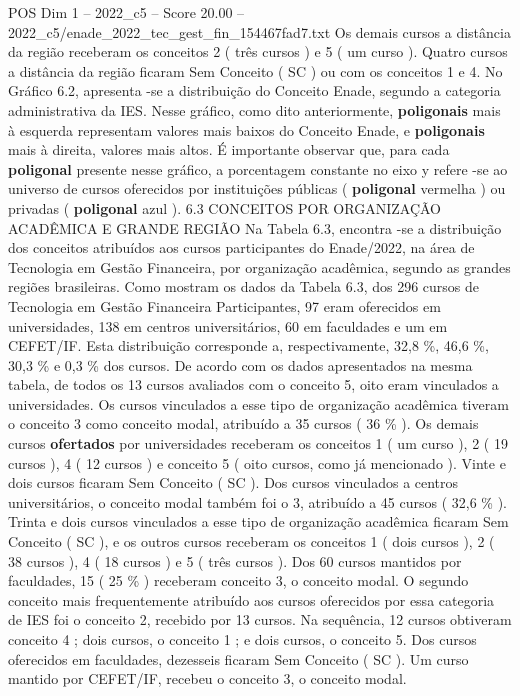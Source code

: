 \begin{textsample}{POS Dim 1 – 2022\_c5 – Score 20.00 – 2022\_c5/enade\_2022\_tec\_gest\_fin\_154467fad7.txt}
Os demais cursos a distância da região receberam os conceitos 2 ( três cursos ) e 5 ( um curso ).
Quatro cursos a distância da região ficaram Sem Conceito ( SC ) ou com os conceitos 1 e 4.
No Gráfico 6.2, apresenta -se a distribuição do Conceito Enade, segundo a categoria administrativa da IES.
Nesse gráfico, como dito anteriormente, \textbf{poligonais} mais à esquerda representam valores mais baixos do Conceito Enade, e \textbf{poligonais} mais à direita, valores mais altos.
É importante observar que, para cada \textbf{poligonal} presente nesse gráfico, a porcentagem constante no eixo y refere -se ao universo de cursos oferecidos por instituições públicas ( \textbf{poligonal} vermelha ) ou privadas ( \textbf{poligonal} azul ). 6.3 CONCEITOS POR ORGANIZAÇÃO ACADÊMICA E GRANDE REGIÃO Na Tabela 6.3, encontra -se a distribuição dos conceitos atribuídos aos cursos participantes do Enade/2022, na área de Tecnologia em Gestão Financeira, por organização acadêmica, segundo as grandes regiões brasileiras.
Como mostram os dados da Tabela 6.3, dos 296 cursos de Tecnologia em Gestão Financeira Participantes, 97 eram oferecidos em universidades, 138 em centros universitários, 60 em faculdades e um em CEFET/IF.
Esta distribuição corresponde a, respectivamente, 32,8 \%, 46,6 \%, 30,3 \% e 0,3 \% dos cursos.
De acordo com os dados apresentados na mesma tabela, de todos os 13 cursos avaliados com o conceito 5, oito eram vinculados a universidades.
Os cursos vinculados a esse tipo de organização acadêmica tiveram o conceito 3 como conceito modal, atribuído a 35 cursos ( 36 \% ).
Os demais cursos \textbf{ofertados} por universidades receberam os conceitos 1 ( um curso ), 2 ( 19 cursos ), 4 ( 12 cursos ) e conceito 5 ( oito cursos, como já mencionado ).
Vinte e dois cursos ficaram Sem Conceito ( SC ).
Dos cursos vinculados a centros universitários, o conceito modal também foi o 3, atribuído a 45 cursos ( 32,6 \% ).
Trinta e dois cursos vinculados a esse tipo de organização acadêmica ficaram Sem Conceito ( SC ), e os outros cursos receberam os conceitos 1 ( dois cursos ), 2 ( 38 cursos ), 4 ( 18 cursos ) e 5 ( três cursos ).
Dos 60 cursos mantidos por faculdades, 15 ( 25 \% ) receberam conceito 3, o conceito modal.
O segundo conceito mais frequentemente atribuído aos cursos oferecidos por essa categoria de IES foi o conceito 2, recebido por 13 cursos.
Na sequência, 12 cursos obtiveram conceito 4 ; dois cursos, o conceito 1 ; e dois cursos, o conceito 5.
Dos cursos oferecidos em faculdades, dezesseis ficaram Sem Conceito ( SC ).
Um curso mantido por CEFET/IF, recebeu o conceito 3, o conceito modal.

\end{textsample}
